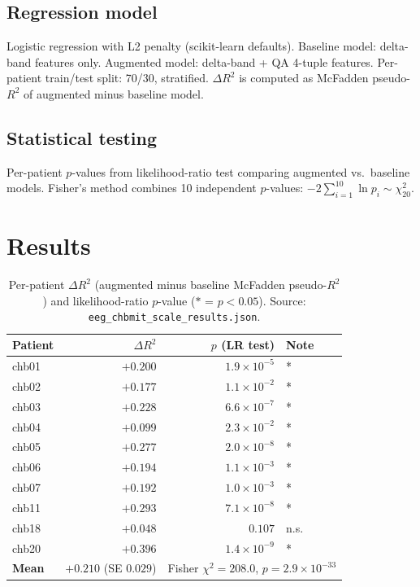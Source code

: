 \documentclass[11pt]{article}
\begin{document}
\subsection{Regression model}

Logistic regression with L2 penalty (scikit-learn defaults).
Baseline model: delta-band features only.
Augmented model: delta-band + QA 4-tuple features.
Per-patient train/test split: 70/30, stratified.
$\Delta R^2$ is computed as McFadden pseudo-$R^2$ of augmented minus baseline model.

\subsection{Statistical testing}

Per-patient $p$-values from likelihood-ratio test comparing augmented vs.\ baseline
models.  Fisher's method combines 10 independent $p$-values:
$-2 \sum_{i=1}^{10} \ln p_i \sim \chi^2_{20}$.

\section{Results}\label{sec:results}

\begin{table}[h]
\centering
\small
\begin{tabular}{lrrl}
\toprule
\textbf{Patient} & $\Delta R^2$ & $p$ (LR test) & \textbf{Note} \\
\midrule
chb01 & $+0.200$ & $1.9 \times 10^{-5}$ & * \\
chb02 & $+0.177$ & $1.1 \times 10^{-2}$ & * \\
chb03 & $+0.228$ & $6.6 \times 10^{-7}$ & * \\
chb04 & $+0.099$ & $2.3 \times 10^{-2}$ & * \\
chb05 & $+0.277$ & $2.0 \times 10^{-8}$ & * \\
chb06 & $+0.194$ & $1.1 \times 10^{-3}$ & * \\
chb07 & $+0.192$ & $1.0 \times 10^{-3}$ & * \\
chb11 & $+0.293$ & $7.1 \times 10^{-8}$ & * \\
chb18 & $+0.048$ & $0.107$ & n.s. \\
chb20 & $+0.396$ & $1.4 \times 10^{-9}$ & * \\
\midrule
\textbf{Mean} & $\mathbf{+0.210}$ (SE $0.029$) & \multicolumn{2}{l}{Fisher $\chi^2=208.0$, $p=2.9\times10^{-33}$} \\
\bottomrule
\end{tabular}
\caption{Per-patient $\Delta R^2$ (augmented minus baseline McFadden pseudo-$R^2$)
and likelihood-ratio $p$-value ($*$ = $p < 0.05$).
Source: \texttt{eeg\_chbmit\_scale\_results.json}.}
\label{tab:results}
\end{table}
\end{document}
